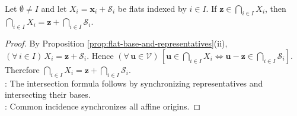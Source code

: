 \begin{lemma} \label{lem:intersection-of-flats} \\
Let $\emptyset\neq I$ and let $X_i=\mathbf{x}_i+\mathcal{S}_i$ be flats indexed by $i\in I$. If $\mathbf{z}\in\bigcap\limits_{i\in I}X_i$, then $\bigcap\limits_{i\in I}X_i=\mathbf{z}+\bigcap\limits_{i\in I}\mathcal{S}_i$.
\begin{proof}
By Proposition \ref{prop:flat-base-and-representatives}(ii), $(\forall\,i\in I)\,X_i=\mathbf{z}+\mathcal{S}_i$. Hence $(\forall\,\mathbf{u}\in\mathcal{V})\,[\mathbf{u}\in\bigcap\limits_{i\in I}X_i\iff\mathbf{u}-\mathbf{z}\in\bigcap\limits_{i\in I}\mathcal{S}_i]$. Therefore $\bigcap\limits_{i\in I}X_i=\mathbf{z}+\bigcap\limits_{i\in I}\mathcal{S}_i$.\\
: The intersection formula follows by synchronizing representatives and intersecting their bases.\\
: Common incidence synchronizes all affine origins.
\end{proof}
\end{lemma}

